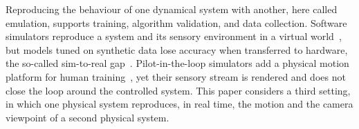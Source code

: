 






Reproducing the behaviour of one dynamical system with another, here called emulation, supports training, algorithm validation, and data collection. Software simulators reproduce a system and its sensory environment in a virtual world~\cite{shah2017airsim, amer2023unav}, but models tuned on synthetic data lose accuracy when transferred to hardware, the so-called sim-to-real gap~\cite{gao2020realitygap, aljalbout2025reality}. Pilot-in-the-loop simulators add a physical motion platform for human training~\cite{stroosma2003using, edvani1997simona, vanpaassen2006simona}, yet their sensory stream is rendered and does not close the loop around the controlled system. This paper considers a third setting, in which one physical system reproduces, in real time, the motion and the camera viewpoint of a second physical system.

